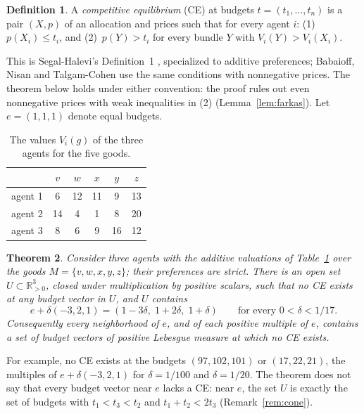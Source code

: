 \documentclass[11pt]{article}
\newtheorem{theorem}{Theorem}[section]
\theoremstyle{definition}
\newtheorem{definition}[theorem]{Definition}
\theoremstyle{remark}
\begin{document}
\begin{definition}\label{def:ce}
A \emph{competitive equilibrium} (CE) at budgets $t=(t_1,\dots,t_n)$ is a
pair $(X,p)$ of an allocation and prices such that for every agent $i$:
(1)~$p(X_i)\le t_i$, and (2)~$p(Y)>t_i$ for every bundle $Y$ with
$V_i(Y)>V_i(X_i)$.
\end{definition}

This is Segal-Halevi's Definition~1 \cite{SH}, specialized to additive
preferences; Babaioff, Nisan and Talgam-Cohen \cite[Definition~2.1]{BNT}
use the same conditions with nonnegative prices. The theorem below holds
under either convention: the proof rules out even nonnegative prices with
weak inequalities in (2) (Lemma~\ref{lem:farkas}). Let $e=(1,1,1)$ denote
equal budgets.

\begin{table}[ht]
\centering
\begin{tabular}{lccccc}
\toprule
 & $v$ & $w$ & $x$ & $y$ & $z$\\
\midrule
agent 1 & 6 & 12 & 11 & 9 & 13\\
agent 2 & 14 & 4 & 1 & 8 & 20\\
agent 3 & 8 & 6 & 9 & 16 & 12\\
\bottomrule
\end{tabular}
\caption{The values $V_i(g)$ of the three agents for the five goods.}
\label{tab:values}
\end{table}

\begin{theorem}\label{thm:main}
Consider three agents with the additive valuations of Table~\ref{tab:values}
over the goods $M=\{v,w,x,y,z\}$; their preferences are strict. There is an
open set $U\subset\mathbb{R}^3_{>0}$, closed under multiplication by positive
scalars, such that no CE exists at any budget vector in $U$, and $U$
contains
\[
  e+\delta(-3,2,1)=(1-3\delta,\;1+2\delta,\;1+\delta)\qquad\text{for every }0<\delta<1/17 .
\]
Consequently every neighborhood of $e$, and of each positive multiple of
$e$, contains a set of budget vectors of positive Lebesgue measure at which
no CE exists.
\end{theorem}

For example, no CE exists at the budgets $(97,102,101)$ or $(17,22,21)$,
the multiples of $e+\delta(-3,2,1)$ for $\delta=1/100$ and $\delta=1/20$.
The theorem does not say that every budget vector near $e$ lacks a CE:
near $e$, the set $U$ is exactly the set of budgets with $t_1<t_3<t_2$ and
$t_1+t_2<2t_3$ (Remark~\ref{rem:cone}).
\end{document}
